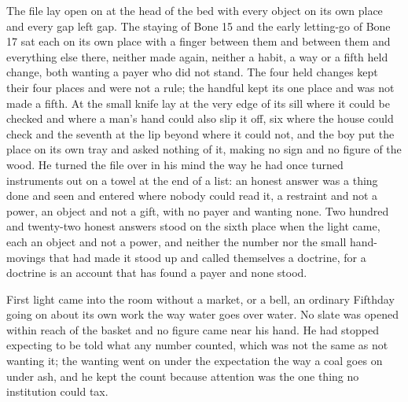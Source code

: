 The file lay open on  at the head of the bed with every object on its own place and every gap left gap. The staying of Bone 15 and the early letting-go of Bone 17 sat each on its own place with a finger between them and between them and everything else there, neither made again, neither a habit, a way or a fifth held change, both wanting a payer who did not stand. The four held changes kept their four places and were not a rule; the handful kept its one place and was not made a fifth. At  the small knife lay at the very edge of its sill where it could be checked and where a man's hand could also slip it off, six where the house could check and the seventh at the lip beyond where it could not, and the boy put the place on its own tray and asked nothing of it, making no sign and no figure of the wood. He turned the file over in his mind the way he had once turned instruments out on a towel at the end of a list: an honest answer was a thing done and seen and entered where nobody could read it, a restraint and not a power, an object and not a gift, with no payer and wanting none. Two hundred and twenty-two honest answers stood on the sixth place when the light came, each an object and not a power, and neither the number nor the small hand-movings that had made it stood up and called themselves a doctrine, for a doctrine is an account that has found a payer and none stood.

\scenebreak

First light came into the room without a market,  or a bell, an ordinary Fifthday going on about its own work the way water goes over water. No slate was opened within reach of the basket and no figure came near his hand. He had stopped expecting to be told what any number counted, which was not the same as not wanting it; the wanting went on under the expectation the way a coal goes on under ash, and he kept the count because attention was the one thing no institution could tax.


